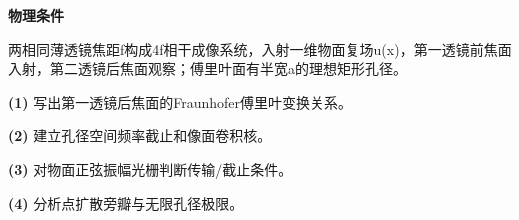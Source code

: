 \textbf{物理条件}\par 两相同薄透镜焦距f构成4f相干成像系统，入射一维物面复场u(x)，第一透镜前焦面入射，第二透镜后焦面观察；傅里叶面有半宽a的理想矩形孔径。
\par\noindent\textbf{(1)} 写出第一透镜后焦面的Fraunhofer傅里叶变换关系。
\par\noindent\textbf{(2)} 建立孔径空间频率截止和像面卷积核。
\par\noindent\textbf{(3)} 对物面正弦振幅光栅判断传输/截止条件。
\par\noindent\textbf{(4)} 分析点扩散旁瓣与无限孔径极限。
